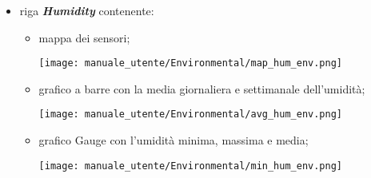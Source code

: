 \begin{itemize}
    \item riga \textit{\textbf{Humidity}} contenente:
    \begin{itemize}
        \item mappa dei sensori;
        \begin{center}
            \texttt{[image: manuale\_utente/Environmental/map\_hum\_env.png]}
        \end{center}
        \item grafico a barre con la media giornaliera e settimanale dell'umidità;
        \begin{center}
            \texttt{[image: manuale\_utente/Environmental/avg\_hum\_env.png]}
        \end{center}
        \item grafico Gauge con l'umidità minima, massima e media;
        \begin{center}
            \texttt{[image: manuale\_utente/Environmental/min\_hum\_env.png]}
        \end{center}
    \end{itemize}


\end{itemize}
